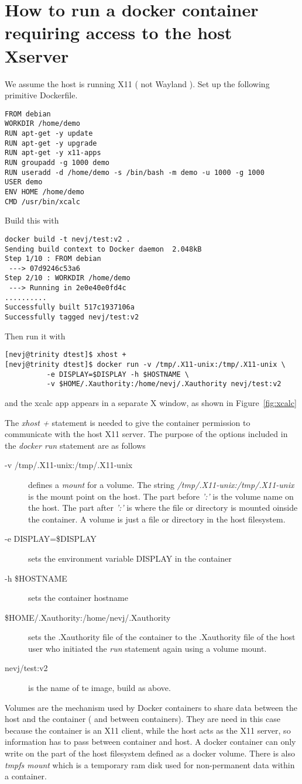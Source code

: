 \documentclass{article}  %
\begin{document}
\section{How to run a docker container requiring access to the host Xserver}
We assume the host is running X11 ( not Wayland ). Set up the following primitive Dockerfile.
\begin{verbatim}
FROM debian
WORKDIR /home/demo
RUN apt-get -y update
RUN apt-get -y upgrade
RUN apt-get -y x11-apps
RUN groupadd -g 1000 demo
RUN useradd -d /home/demo -s /bin/bash -m demo -u 1000 -g 1000
USER demo
ENV HOME /home/demo
CMD /usr/bin/xcalc
\end{verbatim}
 Build this with 
\begin{verbatim}
docker build -t nevj/test:v2 .
Sending build context to Docker daemon  2.048kB
Step 1/10 : FROM debian
 ---> 07d9246c53a6
Step 2/10 : WORKDIR /home/demo
 ---> Running in 2e0e40e0fd4c
..........
Successfully built 517c1937106a
Successfully tagged nevj/test:v2
\end{verbatim}
 Then run it with
\begin{verbatim}
[nevj@trinity dtest]$ xhost +
[nevj@trinity dtest]$ docker run -v /tmp/.X11-unix:/tmp/.X11-unix \
          -e DISPLAY=$DISPLAY -h $HOSTNAME \
          -v $HOME/.Xauthority:/home/nevj/.Xauthority nevj/test:v2
\end{verbatim}
and the xcalc app appears in a separate X window, as shown in Figure~\ref{fig:xcalc}

The {\em xhost +} statement is needed to give the container permission to communicate with the host X11 server. 
 The purpose of the options included in the {\em docker run} statement are as follows
\begin{description}
\item[-v /tmp/.X11-unix:/tmp/.X11-unix] defines a {\em mount} for a volume. The string {\em /tmp/.X11-unix:/tmp/.X11-unix} is the mount point on the host. The part before {\em ':'} is the volume name on the host. The part after {\em ':'} is where the file or directory is mounted oinside the container. A volume is just a file or directory in the host filesystem.
\item[-e DISPLAY=\$DISPLAY] sets the environment variable DISPLAY in the container
\item[-h \$HOSTNAME] sets the container hostname
\item[\$HOME/.Xauthority:/home/nevj/.Xauthority] sets the .Xauthority file of the container to the .Xauthority file of the host user who initiated the {\em run} statement again using a volume mount.
\item[nevj/test:v2] is the name of te image, build as above.
\end{description}
Volumes are the mechanism used by Docker containers to share data between the host and the container ( and between containers). They are need in this case because the container is an X11 client, while the host acts as the X11 server, so information has to pass between container and host.  A docker container can only write on the part of the host filesystem defined as a docker volume. There is also {\em tmpfs mount} which is a temporary ram disk used for non-permanent data within a container.
\end{document}
